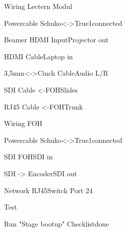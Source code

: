 \begin{checklist}{Wiring Lectern Modul}
  \item{Powercable Schuko<->True1}{connected}
  \item{Beamer HDMI Input}{Projector out}
  \item{HDMI Cable}{Laptop in}
  \item{3,5mm<->Cinch Cable}{Audio L/R}
  \item{SDI Cable <-FOH}{Slides}
  \item{RJ45 Cable <-FOH}{Trunk}
\end{checklist}

\begin{checklist}{Wiring FOH}
  \item{Powercable Schuko<->True1}{connected}
  \item{SDI FOH}{SDI in}
  \item{SDI -> Encoder}{SDI out}
  \item{Network RJ45}{Switch Port 24}
\end{checklist}

\begin{checklist}{Test}
  \item{Run "Stage bootup" Checklist}{done}
\end{checklist}

